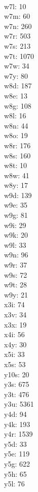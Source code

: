 \begin{multicols}{8}
  \\ w7l: 10
  \\ w7m: 60
  \\ w7n: 260
  \\ w7r: 503
  \\ w7s: 213
  \\ w7t: 1070
  \\ w7w: 34
  \\ w7y: 80
  \\ w8d: 187
  \\ w8e: 13
  \\ w8g: 108
  \\ w8l: 16
  \\ w8n: 44
  \\ w8o: 19
  \\ w8r: 176
  \\ w8s: 160
  \\ w8t: 10
  \\ w8w: 41
  \\ w8y: 17
  \\ w9d: 139
  \\ w9e: 35
  \\ w9g: 81
  \\ w9i: 29
  \\ w9k: 20
  \\ w9l: 33
  \\ w9n: 96
  \\ w9r: 37
  \\ w9s: 72
  \\ w9t: 28
  \\ w9y: 21
  \\ x3i: 74
  \\ x3v: 34
  \\ x3x: 19
  \\ x4i: 56
  \\ x4y: 30
  \\ x5i: 33
  \\ x5s: 53
  \\ y10s: 20
  \\ y3s: 675
  \\ y3t: 476
  \\ y3u: 5361
  \\ y4d: 94
  \\ y4k: 193
  \\ y4r: 1539
  \\ y5d: 33
  \\ y5e: 119
  \\ y5g: 622
  \\ y5h: 65
  \\ y5l: 76

\end{multicols}
